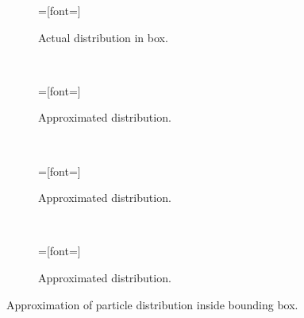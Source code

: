 
\newcommand{\myfigwidth}{0.49\linewidth}
\setlength{}
\setlength{}

\begin{figure}[H]
	\centering
	\begin{subfigure}[b]{\myfigwidth}
		=[font=\scriptsize]
		
		\caption{Actual distribution in box.}
		\label{fig:elong10}
	\end{subfigure}
	~
	\begin{subfigure}[b]{\myfigwidth}
		=[font=\scriptsize]
		
		\caption{Approximated distribution.}
		\label{fig:elong30}
	\end{subfigure}
	\\
	\begin{subfigure}[b]{\myfigwidth}
		=[font=\scriptsize]
		
		\caption{Approximated distribution.}
		\label{fig:elong50}
	\end{subfigure}
	~
	\begin{subfigure}[b]{\myfigwidth}
		=[font=\scriptsize]
		
		\caption{Approximated distribution.}
		\label{fig:elong100}
	\end{subfigure}
	\caption{Approximation of particle distribution inside bounding box.}
	\label{fig:elong}
\end{figure}
